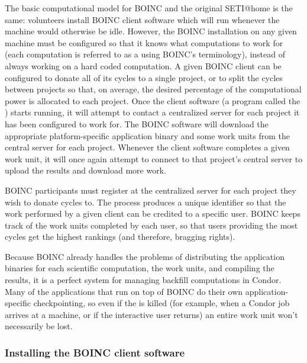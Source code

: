 The basic computational model for BOINC and the original SETI@home is
the same: volunteers install BOINC client software which will run
whenever the machine would otherwise be idle.
However, the BOINC installation on any given machine must be
configured so that it knows what computations to work for (each
computation is referred to as a  using BOINC's
terminology), instead of always working on a hard coded computation.
A given BOINC client can be configured to donate all of its cycles to
a single project, or to split the cycles between projects so that, on
average, the desired percentage of the computational power is
allocated to each project.
Once the client software (a program called the )
starts running, it will attempt to contact a centralized server for
each project it has been configured to work for.
The BOINC software will download the appropriate platform-specific
application binary and some work units from the central server for
each project.
Whenever the client software completes a given work unit, it will once
again attempt to connect to that project's central server to upload
the results and download more work.

BOINC participants must register at the centralized server for each
project they wish to donate cycles to.
The process produces a unique identifier so that the work performed by
a given client can be credited to a specific user.
BOINC keeps track of the work units completed by each user, so that
users providing the most cycles get the highest rankings (and
therefore, bragging rights).

Because BOINC already handles the problems of distributing the
application binaries for each scientific computation, the work units,
and compiling the results, it is a perfect system for managing
backfill computations in Condor.
Many of the applications that run on top of BOINC do their own
application-specific checkpointing, so even if the
 is killed (for example, when a Condor job arrives
at a machine, or if the interactive user returns) an entire work unit
won't necessarily be lost.


\subsubsection{\label{sec:Backfill-BOINC-install}Installing the BOINC client
software}

